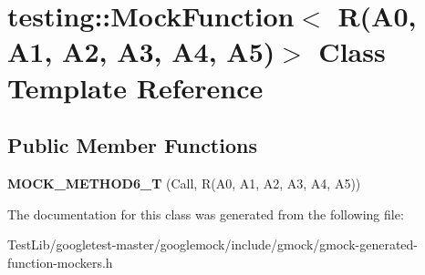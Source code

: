 \hypertarget{classtesting_1_1MockFunction_3_01R_07A0_00_01A1_00_01A2_00_01A3_00_01A4_00_01A5_08_4}{}\section{testing\+:\+:Mock\+Function$<$ R(A0, A1, A2, A3, A4, A5)$>$ Class Template Reference}
\label{classtesting_1_1MockFunction_3_01R_07A0_00_01A1_00_01A2_00_01A3_00_01A4_00_01A5_08_4}
\subsection*{Public Member Functions}
\begin{DoxyCompactItemize}
\item 
\mbox{\label{classtesting_1_1MockFunction_3_01R_07A0_00_01A1_00_01A2_00_01A3_00_01A4_00_01A5_08_4_ae66d20991ea3ab7d2b817c54df80653e}} 
{\bfseries M\+O\+C\+K\+\_\+\+M\+E\+T\+H\+O\+D6\+\_\+T} (Call, R(A0, A1, A2, A3, A4, A5))
\end{DoxyCompactItemize}


The documentation for this class was generated from the following file\+:\begin{DoxyCompactItemize}
\item 
Test\+Lib/googletest-\/master/googlemock/include/gmock/gmock-\/generated-\/function-\/mockers.\+h\end{DoxyCompactItemize}

